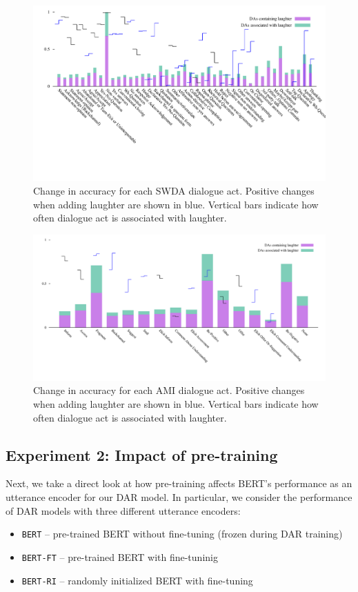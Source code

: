 \documentclass[11pt,a4paper]{article}
\begin{document}
\begin{figure}
  \centering
  \includegraphics[width=\textwidth]{img/SWDA-bertLvsNL.pdf}
  \caption{Change in accuracy for each SWDA dialogue act. Positive changes when adding laughter are shown in blue. Vertical bars indicate how often dialogue act is associated with laughter.}
\end{figure}

\begin{figure}
  \centering
  \includegraphics[width=\textwidth]{img/AMI-DA-bertLvsNL.pdf}
  \caption{Change in accuracy for each AMI dialogue act. Positive changes when adding laughter are shown in blue. Vertical bars indicate how often dialogue act is associated with laughter.}
\end{figure}

\subsection{Experiment 2: Impact of pre-training} %
Next, we take a direct look at how pre-training affects BERT's performance as an utterance encoder for our DAR model.
In particular, we consider the performance of DAR models with three different utterance encoders:
\begin{itemize}
  \item \texttt{BERT} -- pre-trained BERT without fine-tuning (frozen during DAR training)
  \item \texttt{BERT-FT} -- pre-trained BERT with fine-tuninig 
  \item \texttt{BERT-RI} -- randomly initialized BERT with fine-tuning 
\end{itemize}
\end{document}
